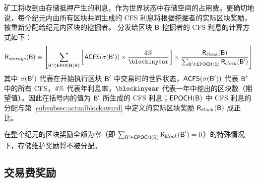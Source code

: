 矿工将收到由存储抵押产生的利息，作为世界状态中存储空间的占用费。更确切地说，每个纪元内由所有区块共同生成的 CFS 利息将根据挖掘者的实际区块奖励，被重新分配给纪元内区块的挖掘者。
分发给区块 $\textsf{B}$ 挖掘者的 CFS 利息的计算方式如下：
	\begin{align}
		\storageaward(\block) \eqdef 
		\left\lfloor \sum_{\block'\in\epf(\block)} \left\lfloor \mathsf{ACFS}(\st(\block'))
		\times \frac{\interest}{\blockinyear}\right\rfloor
		\times \frac{\award(\block)}{\sum_{\block'\in\epf(\block)} \award(\block') } \right\rfloor
	\end{align}
其中 $\mathbf{\sigma}(\textsf{B}')$ 代表在开始执行区块 $\textsf{B}'$ 中交易时的世界状态，$\mathsf{ACFS}(\mathbf{\sigma}(\textsf{B}'))$ 代表 $\textsf{B}'$ 中的所有 CFS，${4\%}$ 代表年利息率，$\blockinyear$ 代表一年中挖出的区块数（期望值）。因此在括号内的值为 $\textsf{B}'$ 所生成的 CFS 利息；$\mathsf{EPOCH} (\textsf{B})$ 中 CFS 利息的分配与第 \ref{subsubsec:actualblockaward} 中定义的实际区块奖励 $\textsf{R}_{block}(\textsf{B})$ 成正比。

在整个纪元的区块奖励全额为零（即 $\sum_{\textsf{B}'\in\mathsf{EPOCH} (\textsf{B})} \textsf{R}_{block}(\textsf{B}')=0$）的特殊情况下，存储维护奖励将不被分配。




\subsection{交易费奖励}

